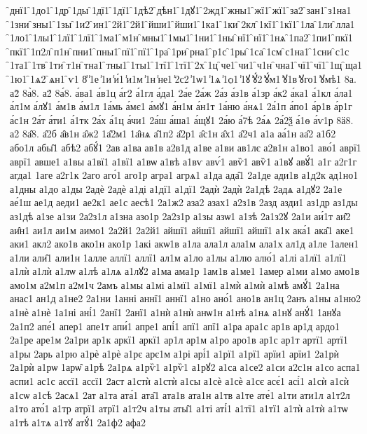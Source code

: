 {̑днї1
̑1до1
̑1др
̑1ды
̑1дї1
̑1дї1
̑1дѣ2
̑дѣн1
̑1дꙋ1
̑2жд1
̑жны1
̑жї1
̑жї1
̑за2
̑зан1
̑з1на1
̑1зни
̑зны1
̑1зы
̑1и2
̑ин1
̑2й1
̑2й1
̑йши1
̑йши1
̑1ка1
̑1ки
̑2кл
̑1кї1
̑1кї1
̑1ла
̑1ли
̑лла1
̑1ло1
̑1лы1
̑1лї1
̑1лї1
̑1ма1
̑м1н
̑мны1
̑1мы1
̑1ни1
̑1ны
̑нї1
̑нї1
̑1нѧ
̑1па2
̑1пи1
̑пкї1
̑пкї1
̑1п2л
̑п1н
̑пни1
̑пны1
̑пї1
̑пї1
̑1ра
̑1ри
̑рна1
̑р1с
̑1ры
̑1са
̑1см
̑с1на1
̑1сни
̑с1с
̑1та1
̑1тв
̑1ти
̑т1н
̑тна1
̑тны1
̑1ты1
̑1тї1
̑1тї1
̑2х
̑1ц
̑че1
̑чи1
̑ч1н
̑чна1
̑чї1
̑чї1
̑1щ
̑ща1
̑1ю1
̑1ѧ2
̑ѧн1
̑ѵ1
8̾
̾1е
̾1и
̾и́1
̾и1м
̾1н
̾не1
̾2с2
̾1ѡ1
̾1ѧ
̾1ѻ1
̾1ꙋ
̾ꙋ́2
̾ꙋ́м1
̾ꙋ1в
̾ꙋго1
̾ꙋмѣ1
8а.
а2̀
8а̀8.
а2́
8а́8.
а́ва1
а́в1ц
а́г2
а́1гл
а́да1
2а́е
2а́ж
2а́з
а́з1в
а́1зр
а́к2
а́ка1
а́1кл
а́ла1
а́л1м
а́лꙋ1
а́м1в
а́м1л
1а́мь
а́мє1
а́мꙋ1
а́н1м
а́н1т
1а́ню
а́нѧ1
2а́1п
а́по1
а́р1в
а́р1г
а́с1н
2а́т
а́ти1
а́1тк
2а́х
а́1ц
а́чи1
2а́ш
а́ша1
а́щꙋ1
2а́ю
а́7ѣ
2а́ѧ
2а́2ѯ
а́1ѳ
а́ѵ1р
8ӓ8.
а2̑
8а̑8.
а̑2б
а̑в1н
а̑ж2
1а̑2м1
1а̑нѧ
а̑1п2
а̑2р1
а̑с1н
а̑х1
а̑2ч1
а1а
аа́1н
аа̑2
а1б2
або1л
абы̑1
абѣ2
абꙋ́1
2ав
а1ва
ав1в
а2в1д
а1ве
а1ви
ав1лє
а2в1н
а1во1
аво́1
аврї1
аврї1
авше1
а1вы
а1вї1
а1вї1
а1вѡ
а1вѣ
а1вѵ
авѵ́1
авѷ1
авѷ1
а1вꙋ
авꙋ́1
а1г
а2г1г
агда1
1аге
а2г1к
2аго
аго́1
аго1р
агра1
агрѧ1
а1да
ада̑1
2а1де
ади1в
а1д2к
ад1но1
а1дны
а1до
а1ды
2адѐ
2адѐ
а1ді
а1дї1
а1дї1
2адѝ
2адѝ
2а1дѣ
2адѧ
а1дꙋ2
2а1е
ае́1ш
ае1д
аеди1
ае2к1
ае1с
аесѣ1
2а1ж2
аза2
азах1
а2з1в
2азд
азди1
аз1др
аз1ды
аз1дѣ
а1зе
а1зи
2а2з1л
а1зна
азо1р
2а2з1р
а1зы
азѡ1
а1зѣ
2а1з2ꙋ
2а1и
аи́1т
аи̑2
аи̑н1
аи1л
аи1м
аимо1
2а2й1
2а2й1
айшї1
айшї1
айшї1
айшї1
а1к
ака́1
ака̑1
аке1
аки1
акл2
ако1в
ако1н
ако1р
1акі
акѡ1в
а1ла
ала1л
ала1м
ала1х
ал1д
а1ле
1ален1
а1ли
али̑1
али1н
1алле
аллї1
аллї1
ал1м
а1ло
а1лы
а1лю
алю́1
а1лі
а1лї1
а1лї1
а1лѝ
а1лѝ
а1лѡ
а1лѣ
а1лѧ
а1лꙋ2
а1ма
ама1р
1ам1в
а1ме1
1амер
а1ми
а1мо
амо1в
амо1м
а2м1п
а2м1ч
2амъ
а1мы
а1мі
а1мї1
а1мї1
а1мѝ
а1мѝ
а1мѣ
амꙋ́1
2а1на
анас1
ан1д
а1не2
2а1ни
1анні
аннї1
аннї1
а1но
ано́1
ано1в
ан1ц
2анъ
а1ны
а1ню2
а1нѐ
а1нѐ
1а1ні
ані́1
2анї1
2анї1
а1нѝ
а1нѝ
анѡ1н
а1нѣ
а1нѧ
а1нꙋ
анꙋ́1
1анꙋа
2а1п2
апе́1
апер1
апе1т
апи́1
апре1
апі́1
апї1
апї1
а1ра
ара1с
ар1в
ар1д
ардо1
2а1ре
аре1м
2а1ри
ар1к
аркї1
аркї1
ар1л
ар1м
а1ро
аро1в
ар1с
ар1т
артї1
артї1
а1ры
2арь
а1рю
а1рѐ
а1рѐ
а1рє
арє1м
а1рі
арі́1
а1рї1
а1рї1
арїи1
арїи1
2а1рѝ
2а1рѝ
а1рѡ
1арѡ̑
а1рѣ
2а1рѧ
а1рѷ1
а1рѷ1
а1рꙋ2
а1са
а1се2
а1си
а2с1н
а1со
аспа1
аспи1
ас1с
ассї1
ассї1
2аст
а1стѝ
а1стѝ
а1сы
а1сѐ
а1сѐ
а1сє
асє́1
асі́1
а1сѝ
а1сѝ
а1сѡ
а1сѣ
2асѧ1
2ат
а1та
ата́1
ата̑1
ата1в
ата1н
а1тв
а1те
ате́1
а1ти
ати1л
а1т2л
а1то
ато́1
а1тр
атрї1
атрї1
а1т2ч
а1ты
аты̑1
а1ті
аті́1
а1тї1
а1тї1
а1тѝ
а1тѝ
а1тѡ
а1тѣ
а1тѧ
а1тꙋ
атꙋ́1
2а1ф2
афа2
}
